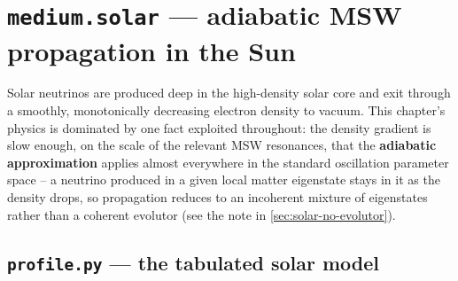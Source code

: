 \chapter{\texttt{medium.solar} --- adiabatic MSW propagation in the Sun}
\label{ch:solar}

Solar neutrinos are produced deep in the high-density solar core and exit
through a smoothly, monotonically decreasing electron density to vacuum.
This chapter's physics is dominated by one fact exploited throughout: the
density gradient is slow enough, on the scale of the relevant MSW
resonances, that the \textbf{adiabatic approximation} applies almost
everywhere in the standard oscillation parameter space -- a neutrino
produced in a given local matter eigenstate stays in it as the density
drops, so propagation reduces to an incoherent mixture of eigenstates
rather than a coherent evolutor (see the note in
\cref{sec:solar-no-evolutor}).

\section{\texttt{profile.py} --- the tabulated solar model}
\label{sec:solar-profile}


